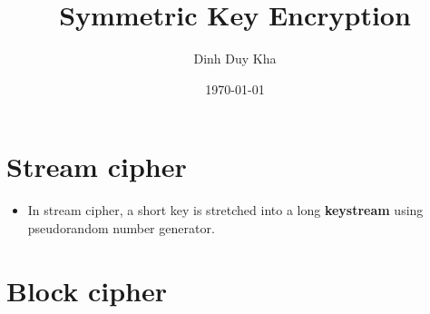 \documentclass[11pt]{article}
\author{Dinh Duy Kha}
\date{\today}
\title{Symmetric Key Encryption}
\begin{document}
\maketitle
\tableofcontents


\section{Stream cipher}
\label{sec:orgad774a7}
\begin{itemize}
\item In stream cipher, a short key is stretched into a long \textbf{keystream} using pseudorandom number generator.
\end{itemize}


\section{Block cipher}
\label{sec:orgdd8884b}
\end{document}
